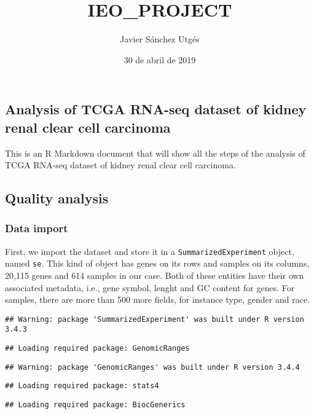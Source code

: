\documentclass[]{article}
\title{IEO\_PROJECT}
\author{Javier Sánchez Utgés}
\date{30 de abril de 2019}
\begin{document}
\maketitle

\subsection{Analysis of TCGA RNA-seq dataset of kidney renal clear cell
carcinoma}\label{analysis-of-tcga-rna-seq-dataset-of-kidney-renal-clear-cell-carcinoma}

This is an R Markdown document that will show all the steps of the
analysis of TCGA RNA-seq dataset of kidney renal clear cell carcinoma.

\subsection{Quality analysis}\label{quality-analysis}

\subsubsection{Data import}\label{data-import}

First, we import the dataset and store it in a
\texttt{SummarizedExperiment} object, named \texttt{se}. This kind of
object has genes on its rows and samples on its columns, 20,115 genes
and 614 samples in our case. Both of these entities have their own
associated metadata, i.e., gene symbol, lenght and GC content for genes.
For samples, there are more than 500 more fields, for instance type,
gender and race.

\begin{verbatim}
## Warning: package 'SummarizedExperiment' was built under R version 3.4.3
\end{verbatim}

\begin{verbatim}
## Loading required package: GenomicRanges
\end{verbatim}

\begin{verbatim}
## Warning: package 'GenomicRanges' was built under R version 3.4.4
\end{verbatim}

\begin{verbatim}
## Loading required package: stats4
\end{verbatim}

\begin{verbatim}
## Loading required package: BiocGenerics
\end{verbatim}
\end{document}
